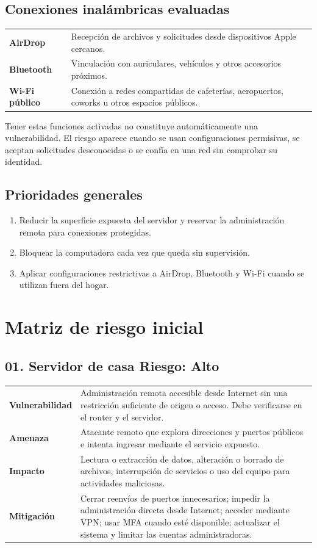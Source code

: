 \documentclass[11pt,a4paper]{article}
\newcommand{\riskfield}[2]{\textcolor{azul}{\textbf{#1}} & #2\\[2pt]}
\begin{document}
\subsection*{Conexiones inalámbricas evaluadas}
\begin{tabularx}{\textwidth}{>{\bfseries\color{azul}}p{2.4cm} X}
  AirDrop & Recepción de archivos y solicitudes desde dispositivos Apple cercanos.\\
  Bluetooth & Vinculación con auriculares, vehículos y otros accesorios próximos.\\
  Wi-Fi público & Conexión a redes compartidas de cafeterías, aeropuertos, coworks u otros espacios públicos.\\
\end{tabularx}

Tener estas funciones activadas no constituye automáticamente una vulnerabilidad. El riesgo aparece cuando se usan configuraciones permisivas, se aceptan solicitudes desconocidas o se confía en una red sin comprobar su identidad.

\subsection*{Prioridades generales}
\begin{enumerate}
  \item Reducir la superficie expuesta del servidor y reservar la administración remota para conexiones protegidas.
  \item Bloquear la computadora cada vez que queda sin supervisión.
  \item Aplicar configuraciones restrictivas a AirDrop, Bluetooth y Wi-Fi cuando se utilizan fuera del hogar.
\end{enumerate}

\newpage
\section*{Matriz de riesgo inicial}
\small
\subsection*{01. Servidor de casa \hfill \textcolor{turquesa}{Riesgo: Alto}}
\begin{tabularx}{\textwidth}{>{\raggedright\arraybackslash}p{2.6cm} >{\raggedright\arraybackslash}X}
  \riskfield{Vulnerabilidad}{Administración remota accesible desde Internet sin una restricción suficiente de origen o acceso. Debe verificarse en el router y el servidor.}
  \riskfield{Amenaza}{Atacante remoto que explora direcciones y puertos públicos e intenta ingresar mediante el servicio expuesto.}
  \riskfield{Impacto}{Lectura o extracción de datos, alteración o borrado de archivos, interrupción de servicios o uso del equipo para actividades maliciosas.}
  \riskfield{Mitigación}{Cerrar reenvíos de puertos innecesarios; impedir la administración directa desde Internet; acceder mediante VPN; usar MFA cuando esté disponible; actualizar el sistema y limitar las cuentas administradoras.}
\end{tabularx}
\end{document}

